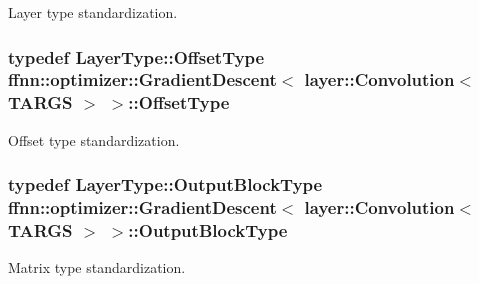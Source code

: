 Layer type standardization. 

\hypertarget{classffnn_1_1optimizer_1_1_gradient_descent_3_01layer_1_1_convolution_3_01_t_a_r_g_s_01_4_01_4_adeba594318f6939122d3e0edb069d6d6}{
\subsubsection[{Offset\-Type}]{\setlength{\rightskip}{0pt plus 5cm}typedef Layer\-Type\-::\-Offset\-Type {\bf ffnn\-::optimizer\-::\-Gradient\-Descent}$<$ {\bf layer\-::\-Convolution}$<$ {\bf T\-A\-R\-G\-S} $>$ $>$\-::{\bf Offset\-Type}}}\label{classffnn_1_1optimizer_1_1_gradient_descent_3_01layer_1_1_convolution_3_01_t_a_r_g_s_01_4_01_4_adeba594318f6939122d3e0edb069d6d6}


Offset type standardization. 

\hypertarget{classffnn_1_1optimizer_1_1_gradient_descent_3_01layer_1_1_convolution_3_01_t_a_r_g_s_01_4_01_4_a24c60e1a115ce2e27567a5b068eaf0a8}{
\subsubsection[{Output\-Block\-Type}]{\setlength{\rightskip}{0pt plus 5cm}typedef Layer\-Type\-::\-Output\-Block\-Type {\bf ffnn\-::optimizer\-::\-Gradient\-Descent}$<$ {\bf layer\-::\-Convolution}$<$ {\bf T\-A\-R\-G\-S} $>$ $>$\-::{\bf Output\-Block\-Type}}}\label{classffnn_1_1optimizer_1_1_gradient_descent_3_01layer_1_1_convolution_3_01_t_a_r_g_s_01_4_01_4_a24c60e1a115ce2e27567a5b068eaf0a8}


Matrix type standardization. 

